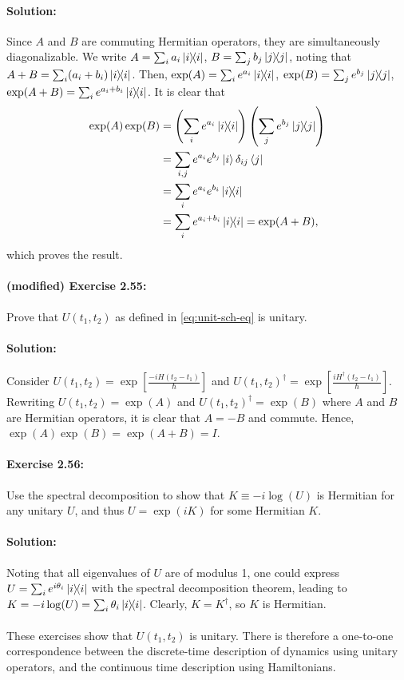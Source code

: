 \paragraph{Solution:} Since $A$ and $B$ are commuting Hermitian operators, they
are simultaneously diagonalizable. We write $A = \sum_i a_i\ketbra{i}{i}$,
$B = \sum_j b_j\ketbra{j}{j}$, noting that $A + B = \sum_i (a_i + b_i)
\ketbra{i}{i}$. Then, $\exp(A) = \sum_i e^{a_i}\ketbra{i}{i}$, $\exp(B) =
\sum_j e^{b_j}\ketbra{j}{j}$, $\exp(A + B) = \sum_i e^{a_i + b_i}
\ketbra{i}{i}$. It is clear that \begin{align*}
  \exp(A)\exp(B)
    &= \left(\sum_i e^{a_i}\ketbra{i}{i}\right)\left(\sum_j e^{b_j}
      \ketbra{j}{j}\right) \\
    &= \sum_{i, j} e^{a_i}e^{b_j}\ket{i}\delta_{ij}\bra{j} \\
    &= \sum_i e^{a_i}e^{b_i}\ketbra{i}{i} \\
    &= \sum_i e^{a_i + b_i}\ketbra{i}{i} = \exp(A + B),
\end{align*} which proves the result.

\paragraph{\cite{mikeandike} (modified) Exercise 2.55:} Prove that $U(t_1,
t_2)$ as defined in \eqref{eq:unit-sch-eq} is unitary.

\paragraph{Solution:} Consider $U(t_1, t_2) = \exp\left[\frac{-iH(t_2 - t_1)}
{\hbar}\right]$ and $U(t_1, t_2)^\dagger = \exp\left[\frac{iH^\dagger(t_2 -
t_1)}{\hbar}\right]$. Rewriting $U(t_1, t_2) = \exp(A)$ and $U(t_1,
t_2)^\dagger = \exp(B)$ where $A$ and $B$ are Hermitian operators, it is clear
that $A = -B$ and commute. Hence, $\exp(A)\exp(B) = \exp(A + B) = I$.

\paragraph{\cite{mikeandike} Exercise 2.56:} Use the spectral decomposition to
show that $K \equiv -i\log(U)$ is Hermitian for any unitary $U$, and thus $U =
\exp(iK)$ for some Hermitian $K$.

\paragraph{Solution:} Noting that all eigenvalues of $U$ are of modulus 1, one
could express $U = \sum_i e^{i\theta_i}\ketbra{i}{i}$ with the spectral
decomposition theorem, leading to $K = -i\log(U) = \sum_i \theta_i\ketbra{i}
{i}$. Clearly, $K = K^\dagger$, so $K$ is Hermitian.

\paragraph{}

These exercises show that $U(t_1, t_2)$ is unitary. There is therefore a
one-to-one correspondence between the discrete-time description of dynamics
using unitary operators, and the continuous time description using
Hamiltonians.

